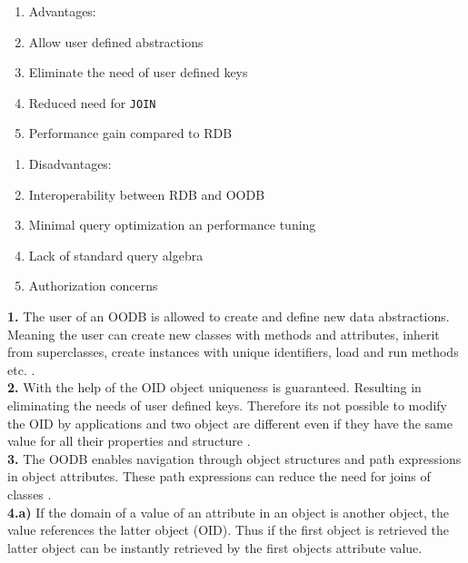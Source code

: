 \documentclass{cslthse-msc}
\begin{document}
\begin{center}
\noindent\begin{minipage}[t]{0.5\linewidth}
    \begin{enumerate}
    \item[] Advantages:
    \item{Allow user defined abstractions}
    \item{Eliminate the need of user defined keys}
    \item{Reduced need for \texttt{JOIN}}
    \item{Performance gain compared to RDB}
    \end{enumerate}
    \end{minipage}%
    \begin{minipage}[t]{0.6\linewidth}
    \begin{enumerate}
    \item[] Disadvantages: 
    \item{Interoperability between RDB and OODB }
    \item{Minimal query optimization an performance tuning}
    \item{Lack of standard query algebra}
    \item{Authorization concerns}
    \end{enumerate}
\end{minipage}
\end{center}
\begin{flushright}
\cite{OODBMS}
\end{flushright}
\textbf{1.} The user of an OODB is allowed to create and define new data abstractions. Meaning the user can create new classes with methods and attributes, inherit from superclasses, create instances with unique identifiers, load and run methods etc. \cite{userdefinedabstractions}.\\ \textbf{2.} With the help of the OID object uniqueness is guaranteed. Resulting in eliminating the needs of user defined keys. Therefore its not possible to modify the OID by applications and two object are different even if they have the same value for all their properties and structure \cite{identity}.\\\textbf{3.} The OODB enables navigation through object structures and path expressions in object attributes. These path expressions can reduce the need for joins of classes \cite{userdefinedabstractions}.\\\textbf{4.}\textbf{a)} If the domain of a value of an attribute in an object is another object, the value references the latter object (OID). Thus if the first object is retrieved the latter object can be instantly retrieved by the first objects attribute value.\\
\end{document}
